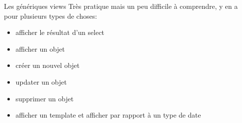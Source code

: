 \documentclass{beamer}
\begin{document}
\begin{frame}[fragile]{Les génériques views}
    Très pratique mais un peu difficile à comprendre, y en a pour plusieurs types de choses:
    \begin{itemize}
        \item afficher le résultat d'un select
        \item afficher un objet
        \item créer un nouvel objet
        \item updater un objet
        \item supprimer un objet
        \item afficher un template et afficher par rapport à un type de date
    \end{itemize}
\end{frame}
\end{document}
